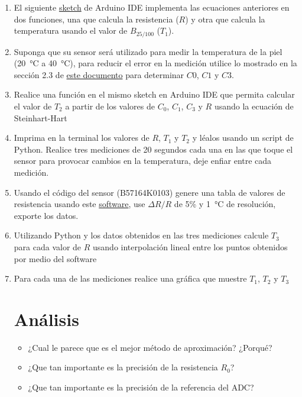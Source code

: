 \begin{enumerate}
\item El siguiente \href{https://github.com/juanjorojash/instrumentacion_I/blob/master/code/L02/L02.ino}{sketch} de Arduino IDE implementa las ecuaciones anteriores en dos funciones, una que calcula la resistencia ($R$) y otra que calcula la temperatura usando el valor de $B_{25/100}$ ($T_1$).
    {\scriptsize 
        
    }
\item Suponga que su sensor será utilizado para medir la temperatura de la piel (\SI{20}{\celsius} a \SI{40}{\celsius}), para reducir el error en la medición utilice lo mostrado en la sección 2.3 de \href{https://www.tdk-electronics.tdk.com/download/2999750/740594dd4ec109808826d1b5c774b3f6/ntc-thermistors-readout-trimming-an.pdf}{este documento} para determinar $C0$, $C1$ y $C3$.
\item Realice una función en el mismo sketch en Arduino IDE que permita calcular el valor de $T_2$ a partir de los valores de $C_0$, $C_1$, $C_3$ y $R$ usando la ecuación de Steinhart-Hart
\item Imprima en la terminal los valores de $R$, $T_1$ y $T_2$ y léalos usando un script de Python. Realice tres mediciones de 20 segundos cada una en las que toque el sensor para provocar cambios en la temperatura, deje enfiar entre cada medición. 
\item Usando el código del sensor (B57164K0103) genere una tabla de valores de resistencia usando este \href{https://tools.tdk-electronics.tdk.com/ntc/}{software}, use $\Delta R / R$ de 5\% y \SI{1}{\celsius} de resolución, exporte los datos.
\item Utilizando Python y los datos obtenidos en las tres mediciones calcule $T_3$ para cada valor de $R$ usando interpolación lineal entre los puntos obtenidos por medio del software 
\item Para cada una de las mediciones realice una gráfica que muestre $T_1$, $T_2$ y $T_3$
\section{Análisis}
\begin{itemize}
    \item ¿Cual le parece que es el mejor método de aproximación? ¿Porqué?
    \item ¿Que tan importante es la precisión de la resistencia $R_0$?
    \item ¿Que tan importante es la precisión de la referencia del ADC?
\end{itemize}

\end{enumerate}